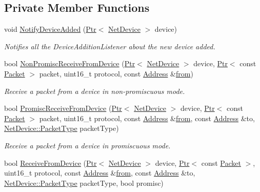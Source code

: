 \subsection*{Private Member Functions}
\begin{DoxyCompactItemize}
\item 
void \hyperlink{classns3_1_1Node_ae85e535c650941f4f8ca6845a9f61e42}{Notify\+Device\+Added} (\hyperlink{classns3_1_1Ptr}{Ptr}$<$ \hyperlink{classns3_1_1NetDevice}{Net\+Device} $>$ device)
\begin{DoxyCompactList}\small\item\em Notifies all the Device\+Addition\+Listener about the new device added. \end{DoxyCompactList}\item 
bool \hyperlink{classns3_1_1Node_a72ebf5bdc911879511f1e249d471f7e5}{Non\+Promisc\+Receive\+From\+Device} (\hyperlink{classns3_1_1Ptr}{Ptr}$<$ \hyperlink{classns3_1_1NetDevice}{Net\+Device} $>$ device, \hyperlink{classns3_1_1Ptr}{Ptr}$<$ const \hyperlink{classns3_1_1Packet}{Packet} $>$ packet, uint16\+\_\+t protocol, const \hyperlink{classns3_1_1Address}{Address} \&\hyperlink{lte__amc_8m_a1b4c81ff74eb1a626b5ade44c81004b3}{from})
\begin{DoxyCompactList}\small\item\em Receive a packet from a device in non-\/promiscuous mode. \end{DoxyCompactList}\item 
bool \hyperlink{classns3_1_1Node_a16cf271eeeab87dc7133ffb3f8b24dc4}{Promisc\+Receive\+From\+Device} (\hyperlink{classns3_1_1Ptr}{Ptr}$<$ \hyperlink{classns3_1_1NetDevice}{Net\+Device} $>$ device, \hyperlink{classns3_1_1Ptr}{Ptr}$<$ const \hyperlink{classns3_1_1Packet}{Packet} $>$ packet, uint16\+\_\+t protocol, const \hyperlink{classns3_1_1Address}{Address} \&\hyperlink{lte__amc_8m_a1b4c81ff74eb1a626b5ade44c81004b3}{from}, const \hyperlink{classns3_1_1Address}{Address} \&to, \hyperlink{classns3_1_1NetDevice_ace65153f09144f55a0d3e702fc29d6b2}{Net\+Device\+::\+Packet\+Type} packet\+Type)
\begin{DoxyCompactList}\small\item\em Receive a packet from a device in promiscuous mode. \end{DoxyCompactList}\item 
bool \hyperlink{classns3_1_1Node_a6cbe61c071c85bb3ba5d4843132cd119}{Receive\+From\+Device} (\hyperlink{classns3_1_1Ptr}{Ptr}$<$ \hyperlink{classns3_1_1NetDevice}{Net\+Device} $>$ device, \hyperlink{classns3_1_1Ptr}{Ptr}$<$ const \hyperlink{classns3_1_1Packet}{Packet} $>$, uint16\+\_\+t protocol, const \hyperlink{classns3_1_1Address}{Address} \&\hyperlink{lte__amc_8m_a1b4c81ff74eb1a626b5ade44c81004b3}{from}, const \hyperlink{classns3_1_1Address}{Address} \&to, \hyperlink{classns3_1_1NetDevice_ace65153f09144f55a0d3e702fc29d6b2}{Net\+Device\+::\+Packet\+Type} packet\+Type, bool promisc)

\end{DoxyCompactItemize}
